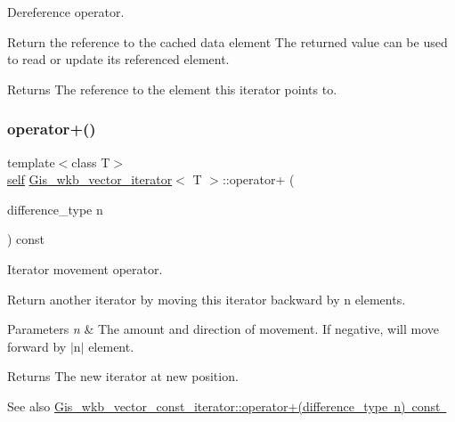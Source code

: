 Dereference operator. 

Return the reference to the cached data element The returned value can be used to read or update its referenced element. \begin{DoxyReturn}{Returns}
The reference to the element this iterator points to. 
\end{DoxyReturn}
\mbox{\label{classGis__wkb__vector__iterator_aabbd4bfbbf7d089178e6491cc5069acf}} 
\subsubsection{\texorpdfstring{operator+()}{operator+()}}
{\footnotesize\ttfamily template$<$class T$>$ \\
\mbox{\hyperlink{classGis__wkb__vector__const__iterator}{self}} \mbox{\hyperlink{classGis__wkb__vector__iterator}{Gis\+\_\+wkb\+\_\+vector\+\_\+iterator}}$<$ T $>$\+::operator+ (\begin{DoxyParamCaption}\item[{difference\+\_\+type}]{n }\end{DoxyParamCaption}) const\hspace{0.3cm}{\ttfamily [inline]}}



Iterator movement operator. 

Return another iterator by moving this iterator backward by n elements. 
\begin{DoxyParams}{Parameters}
{\em n} & The amount and direction of movement. If negative, will move forward by $\vert$n$\vert$ element. \\
\hline
\end{DoxyParams}
\begin{DoxyReturn}{Returns}
The new iterator at new position. 
\end{DoxyReturn}
\begin{DoxySeeAlso}{See also}
\mbox{\hyperlink{classGis__wkb__vector__const__iterator_a56ceef1b31e06b9dd58207de7bd0f20d}{Gis\+\_\+wkb\+\_\+vector\+\_\+const\+\_\+iterator\+::operator+(difference\+\_\+type n) const }} 
\end{DoxySeeAlso}
\mbox{\label{classGis__wkb__vector__iterator_aed302f00b9144114462cdb2600521130}} 
